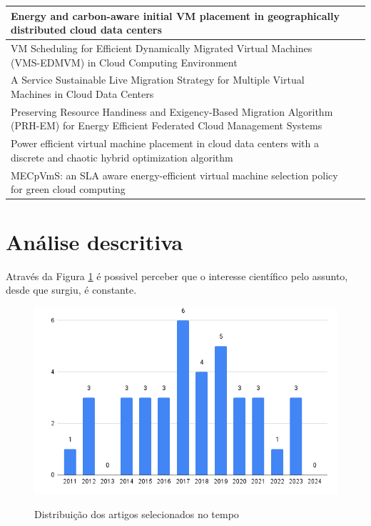 \documentclass[
	12pt,				%
	oneside,			%
	a4paper,			%
	english,			%
	brazil				%
	]{abntex2ppgsi}
\begin{document}
\begin{apendicesenv}
\begin{longtable}{|p{3in}|p{2in}|p{1in}|}
	\hline
	Energy and carbon-aware initial VM placement in geographically distributed cloud data centers & \citeonline{Khodayarseresht2023} \\
	\hline
	VM Scheduling for Efficient Dynamically Migrated Virtual Machines (VMS-EDMVM) in Cloud Computing Environment & \citeonline{Supreeth20221892} \\
	\hline
	A Service Sustainable Live Migration Strategy for Multiple Virtual Machines in Cloud Data Centers & \citeonline{Satpathy2021} \\
	\hline
	Preserving Resource Handiness and Exigency-Based Migration Algorithm (PRH-EM) for Energy Efficient Federated Cloud Management Systems & \citeonline{Karthikeyan2023} \\
	\hline
	Power efficient virtual machine placement in cloud data centers with a discrete and chaotic hybrid optimization algorithm & \citeonline{Gharehpasha20211293} \\
	\hline
	MECpVmS: an SLA aware energy-efficient virtual machine selection policy for green cloud computing & \citeonline{Mandal2023651} \\
	\hline
\end{longtable}

\section{Análise descritiva}\label{section:analise-descritiva}

Através da Figura \ref{fig:artigos-por-ano} é possivel perceber que o interesse científico pelo assunto, desde que surgiu, é constante.
\begin{figure}[htbp]
	\centering
	\caption{Distribuição dos artigos selecionados no tempo}
		\includegraphics[width=\linewidth]{images/artigos-por-ano.png}
	\label{fig:artigos-por-ano}
\end{figure}


\end{apendicesenv}
\end{document}
